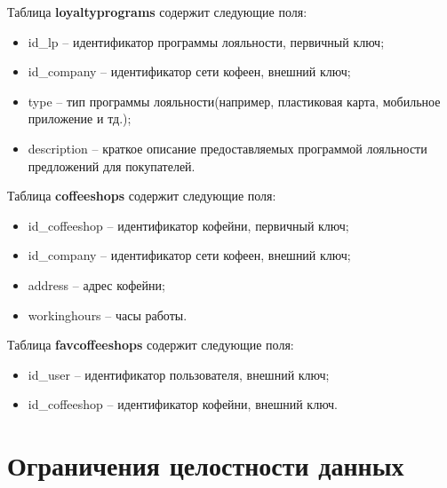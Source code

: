 Таблица \textbf{loyaltyprograms} содержит следующие поля:
\begin{itemize}
	\item id\_lp -- идентификатор программы лояльности, первичный ключ;%
	\item id\_company -- идентификатор сети кофеен, внешний ключ;%
	\item type -- тип программы лояльности(например, пластиковая карта, мобильное приложение и тд.);%
	\item description -- краткое описание предоставляемых программой лояльности предложений для покупателей.%
\end{itemize}

Таблица \textbf{coffeeshops} содержит следующие поля:
\begin{itemize}
	\item id\_coffeeshop -- идентификатор кофейни, первичный ключ;%
	\item id\_company -- идентификатор сети кофеен, внешний ключ;%
	\item address -- адрес кофейни;%
	\item workinghours -- часы работы.%
\end{itemize}

Таблица \textbf{favcoffeeshops} содержит следующие поля:
\begin{itemize}
	\item id\_user -- идентификатор пользователя, внешний ключ;%
	\item id\_coffeeshop -- идентификатор кофейни, внешний ключ.%
\end{itemize}

\section{Ограничения целостности данных}
